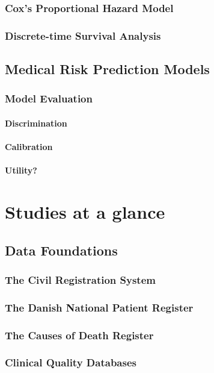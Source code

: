 \section{Cox's Proportional Hazard Model}
\section{Discrete-time Survival Analysis}

\chapter{Medical Risk Prediction Models}
\section{Model Evaluation}
\subsection{Discrimination}
\subsection{Calibration}
\subsection{Utility?}

\part{Studies at a glance}
\chapter{Data Foundations}
\section{The Civil Registration System}
\section{The Danish National Patient Register}
\section{The Causes of Death Register}
\section{Clinical Quality Databases}

